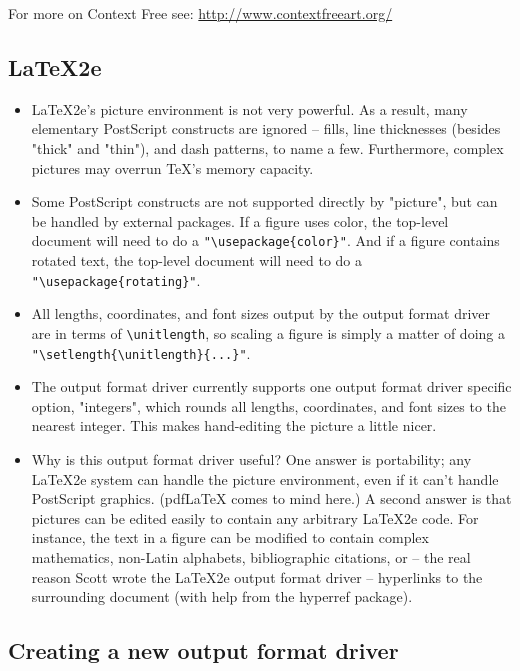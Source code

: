 \documentclass[english,a4paper]{article}
\let\URL\url \let\Email\url \let\File\url
\begin{document}
	For more on Context Free see:
	\URL{http://www.contextfreeart.org/}

  \subsection{LaTeX2e} 

    \begin{itemize}
   \item LaTeX2e's picture environment is not very powerful.  As a result, many
     elementary PostScript constructs are ignored -- fills, line
     thicknesses (besides "thick" and "thin"), and dash patterns, to name a
     few.  Furthermore, complex pictures may overrun TeX's memory capacity.

   \item Some PostScript constructs are not supported directly by "picture",
     but can be handled by external packages.  If a figure uses color, the
     top-level document will need to do a \verb+"\usepackage{color}"+.  And if a
     figure contains rotated text, the top-level document will need to do a
     \verb+"\usepackage{rotating}"+.

   \item All lengths, coordinates, and font sizes output by the output format driver are in
     terms of \verb+\unitlength+, so scaling a figure is simply a matter of doing
     a \verb+"\setlength{\unitlength}{...}"+.

   \item The output format driver currently supports one output format driver specific option,
     "integers", which rounds all lengths, coordinates, and font sizes to
     the nearest integer.  This makes hand-editing the picture a little
     nicer.

   \item Why is this output format driver useful?  One answer is portability; any LaTeX2e
     system can handle the picture environment, even if it can't handle
     PostScript graphics.  (pdfLaTeX comes to mind here.)  A second answer
     is that pictures can be edited easily to contain any arbitrary LaTeX2e
     code.  For instance, the text in a figure can be modified to contain
     complex mathematics, non-Latin alphabets, bibliographic citations, or
     -- the real reason Scott wrote the LaTeX2e output format driver -- hyperlinks to the
     surrounding document (with help from the hyperref package).
   \end{itemize}


  \subsection{Creating a new output format driver}
\end{document}
